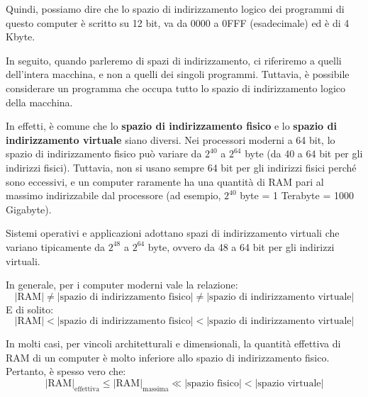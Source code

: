 Quindi, possiamo dire che lo spazio di indirizzamento logico dei programmi di questo computer è scritto su 12 bit, va da 0000 a 0FFF (esadecimale) ed è di 4 Kbyte.

In seguito, quando parleremo di spazi di indirizzamento, ci riferiremo a quelli dell'intera macchina, e non a quelli dei singoli programmi. Tuttavia, è possibile considerare un programma che occupa tutto lo spazio di indirizzamento logico della macchina.


In effetti, è comune che lo \textbf{spazio di indirizzamento fisico} e lo \textbf{spazio di indirizzamento virtuale} siano diversi. Nei processori moderni a 64 bit, lo spazio di indirizzamento fisico può variare da $2^{40}$ a $2^{64}$ byte (da 40 a 64 bit per gli indirizzi fisici). Tuttavia, non si usano sempre 64 bit per gli indirizzi fisici perché sono eccessivi, e un computer raramente ha una quantità di RAM pari al massimo indirizzabile dal processore (ad esempio, $2^{40}$ byte = 1 Terabyte = 1000 Gigabyte).

Sistemi operativi e applicazioni adottano spazi di indirizzamento virtuali che variano tipicamente da $2^{48}$ a $2^{64}$ byte, ovvero da 48 a 64 bit per gli indirizzi virtuali.

In generale, per i computer moderni vale la relazione:
\[
|\text{RAM}| \neq |\text{spazio di indirizzamento fisico}| \neq |\text{spazio di indirizzamento virtuale}|
\]
E di solito:
\[
|\text{RAM}| < |\text{spazio di indirizzamento fisico}| < |\text{spazio di indirizzamento virtuale}|
\]

In molti casi, per vincoli architetturali e dimensionali, la quantità effettiva di RAM di un computer è molto inferiore allo spazio di indirizzamento fisico. Pertanto, è spesso vero che:
\[
|\text{RAM}|_{\text{effettiva}} \leq |\text{RAM}|_{\text{massima}} \ll |\text{spazio fisico}| < |\text{spazio virtuale}|
\]



